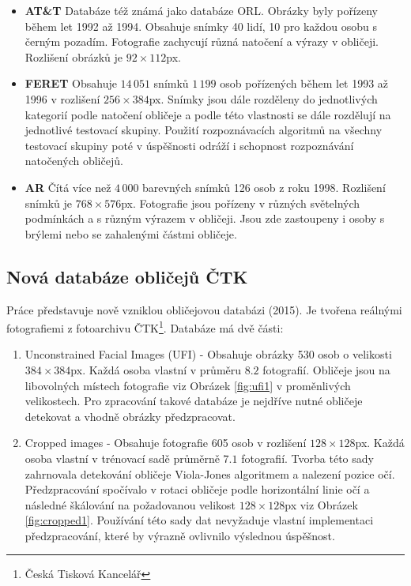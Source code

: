 \documentclass[czech,BP]{thesiskiv}
\begin{document}
\begin{itemize}
\item \textbf{AT\&T} Databáze též známá jako databáze ORL. Obrázky byly pořízeny během let 1992 až 1994. Obsahuje snímky 40 lidí, 10 pro každou osobu s černým pozadím. Fotografie zachycují různá natočení a výrazy v obličeji. Rozlišení obrázků je $92\times 112$px.
\item \textbf{FERET} Obsahuje $14\,051$ snímků $1\,199$ osob pořízených během let 1993 až 1996 v rozlišení $256\times 384$px. Snímky jsou dále rozděleny do jednotlivých kategorií podle natočení obličeje a podle této vlastnosti se dále rozdělují na jednotlivé testovací skupiny. Použití rozpoznávacích algoritmů na všechny testovací skupiny poté v úspěšnosti odráží i schopnost rozpoznávání natočených obličejů.
\item \textbf{AR} Čítá více než $4\,000$ barevných snímků 126 osob z roku 1998. Rozlišení snímků je $768\times 576$px. Fotografie jsou pořízeny v různých světelných podmínkách a s různým výrazem v obličeji. Jsou zde zastoupeny i osoby s brýlemi nebo se zahalenými částmi obličeje. 
\end{itemize}

\subsection{Nová databáze obličejů ČTK}
Práce \citet{LencUfi2015} představuje nově vzniklou obličejovou databázi (2015). Je tvořena reálnými fotografiemi z fotoarchivu ČTK\footnote{Česká Tisková Kancelář}. Databáze má dvě části:

\begin{enumerate}
\item Unconstrained Facial Images (UFI) - Obsahuje obrázky 530 osob o velikosti $384\times384$px. Každá osoba vlastní v průměru $8.2$ fotografií. Obličeje jsou na libovolných místech fotografie viz Obrázek \ref{fig:ufi1} v proměnlivých velikostech. Pro zpracování takové databáze je nejdříve nutné obličeje detekovat a vhodně obrázky předzpracovat. 
\item Cropped images - Obsahuje fotografie 605 osob v rozlišení $128\times128$px. Každá osoba vlastní v trénovací sadě průměrně $7.1$ fotografií. Tvorba této sady zahrnovala detekování obličeje Viola-Jones algoritmem a nalezení pozice očí. Předzpracování spočívalo v rotaci obličeje podle horizontální linie očí a následné škálování na požadovanou velikost $128\times 128$px viz Obrázek \ref{fig:cropped1}. Používání této sady dat nevyžaduje vlastní implementaci předzpracování, které by výrazně ovlivnilo výslednou úspěšnost.
\end{enumerate}
\end{document}
